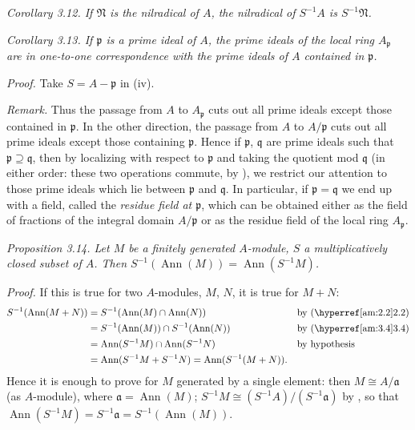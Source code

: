 \noindent\textit{Corollary 3.12. If $\mathfrak N$ is the nilradical of $A$, the nilradical of $S^{-1}A$ is $S^{-1}\mathfrak N$.} \proofbox

\noindent\textit{Corollary 3.13. If $\mathfrak p$ is a prime ideal of $A$, the prime ideals of the local ring $A_{\mathfrak p}$ are in one-to-one correspondence with the prime ideals of $A$ contained in $\mathfrak p$.}

\noindent\textit{Proof.} Take $S=A-\mathfrak p$ in  (iv). \proofbox

\noindent\textit{Remark.} Thus the passage from $A$ to $A_{\mathfrak p}$ cuts out all prime ideals except those contained in $\mathfrak p$. In the other direction, the passage from $A$ to $A/\mathfrak p$ cuts out all prime ideals except those containing $\mathfrak p$. Hence if $\mathfrak p$, $\mathfrak q$ are prime ideals such that $\mathfrak p\supseteq\mathfrak q$, then by localizing with respect to $\mathfrak p$ and taking the quotient mod $\mathfrak q$ (in either order: these two operations commute, by ), we restrict our attention to those prime ideals which lie between $\mathfrak p$ and $\mathfrak q$. In particular, if $\mathfrak p=\mathfrak q$ we end up with a field, called the \textit{residue field at $\mathfrak p$}, which can be obtained either as the field of fractions of the integral domain $A/\mathfrak p$ or as the residue field of the local ring $A_{\mathfrak p}$.

\noindent\textit{Proposition 3.14. Let $M$ be a finitely generated $A$-module, $S$ a multiplicatively closed subset of $A$. Then $S^{-1}(\operatorname{Ann}(M))=\operatorname{Ann}(S^{-1}M)$.}

\noindent\textit{Proof.} If this is true for two $A$-modules, $M$, $N$, it is true for $M+N$:
\[
\begin{aligned}
S^{-1}(\operatorname{Ann}(M+N))
&=S^{-1}(\operatorname{Ann}(M)\cap\operatorname{Ann}(N)) &&\text{by \amref{2.2}}\\
&=S^{-1}(\operatorname{Ann}(M))\cap S^{-1}(\operatorname{Ann}(N)) &&\text{by \amref{3.4}}\\
&=\operatorname{Ann}(S^{-1}M)\cap\operatorname{Ann}(S^{-1}N) &&\text{by hypothesis}\\
&=\operatorname{Ann}(S^{-1}M+S^{-1}N)=\operatorname{Ann}(S^{-1}(M+N)).
\end{aligned}
\]
Hence it is enough to prove  for $M$ generated by a single element: then $M\cong A/\mathfrak a$ (as $A$-module), where $\mathfrak a=\operatorname{Ann}(M)$; $S^{-1}M\cong(S^{-1}A)/(S^{-1}\mathfrak a)$ by , so that $\operatorname{Ann}(S^{-1}M)=S^{-1}\mathfrak a=S^{-1}(\operatorname{Ann}(M))$. \proofbox

